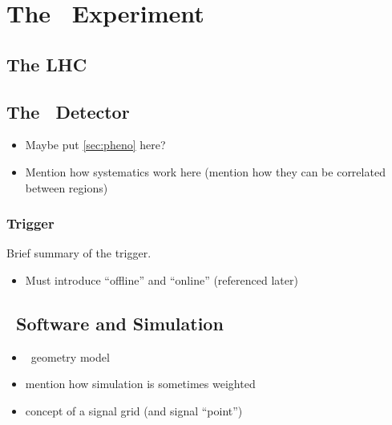 \chapter{The \atlas\ Experiment}
\section{The LHC}
\section{The \atlas\ Detector}
\begin{itemize}
\item Maybe put \cref{sec:pheno} here?
\item Mention how systematics work here (mention how they can be correlated between regions)
\end{itemize}
\subsection{Trigger}
\label{sec:trigger}
Brief summary of the trigger.
\begin{itemize}
\item Must introduce ``offline'' and ``online'' (referenced later)
\end{itemize}
\section{\atlas\ Software and Simulation}
\label{sec:software}
\begin{itemize}
\item \atlas\ geometry model
\item mention how simulation is sometimes weighted
\item concept of a signal grid (and signal ``point'')
\end{itemize}
